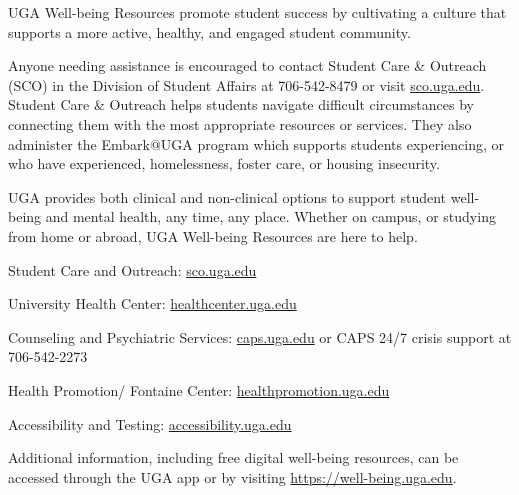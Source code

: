 \documentclass[12pt]{article}
\begin{document}
UGA Well-being Resources promote student success by cultivating a
culture that supports a more active, healthy, and engaged student
community. 

Anyone needing assistance is encouraged to contact Student Care \&
Outreach (SCO) in the Division of Student Affairs at 706-542-8479 or
visit \url{sco.uga.edu}. Student Care \& Outreach helps students
navigate difficult circumstances by connecting them with the most
appropriate resources or services. They also administer the Embark@UGA
program which supports students experiencing, or who have experienced,
homelessness, foster care, or housing insecurity. 

UGA provides both clinical and non-clinical options to support student
well-being and mental health, any time, any place. Whether on campus,
or studying from home or abroad, UGA Well-being Resources are here to
help. 


Student Care and Outreach: \url{sco.uga.edu}

University Health Center: \url{healthcenter.uga.edu}

Counseling and Psychiatric Services: \url{caps.uga.edu} or CAPS 24/7
crisis support at 706-542-2273 

Health Promotion/ Fontaine Center: \url{healthpromotion.uga.edu}

Accessibility and Testing: \url{accessibility.uga.edu}

Additional information, including free digital well-being resources,
can be accessed through the UGA app or by visiting
\url{https://well-being.uga.edu}. 

\end{document}
